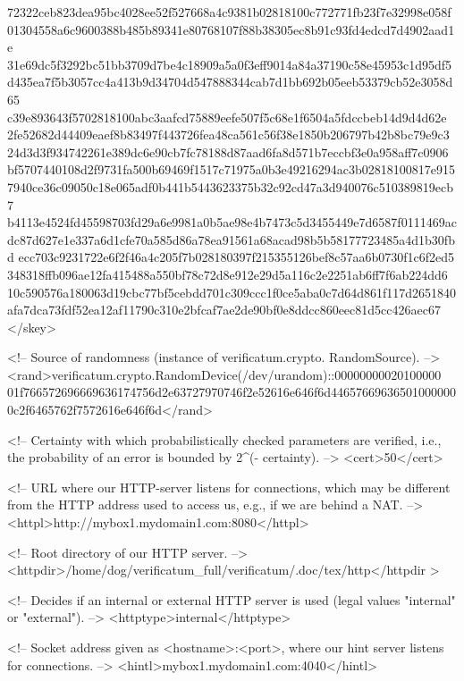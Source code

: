 72322ceb823dea95bc4028ee52f527668a4c9381b02818100c772771fb23f7e32998e058f
01304558a6c9600388b485b89341e80768107f88b38305ec8b91c93fd4edcd7d4902aad1e
31e69dc5f3292bc51bb3709d7be4c18909a5a0f3eff9014a84a37190c58e45953c1d95df5
d435ea7f5b3057cc4a413b9d34704d547888344cab7d1bb692b05eeb53379cb52e3058d65
c39e893643f5702818100abc3aafcd75889eefe507f5c68e1f6504a5fdccbeb14d9d4d62e
2fe52682d44409eaef8b83497f443726fea48ca561c56f38e1850b206797b42b8bc79e9c3
24d3d3f934742261e389dc6e90cb7fc78188d87aad6fa8d571b7eccbf3e0a958aff7c0906
bf5707440108d2f9731fa500b69469f1517c71975a0b3e49216294ac3b02818100817e915
7940ce36c09050c18e065adf0b441b5443623375b32c92cd47a3d940076c510389819ecb7
b4113e4524fd45598703fd29a6e9981a0b5ae98e4b7473c5d3455449e7d6587f0111469ac
dc87d627e1e337a6d1cfe70a585d86a78ea91561a68acad98b5b58177723485a4d1b30fbd
ecc703c9231722e6f2f46a4c205f7b028180397f215355126bef8c57aa6b0730f1c6f2ed5
348318ffb096ae12fa415488a550bf78c72d8e912e29d5a116c2e2251ab6ff7f6ab224dd6
10c590576a180063d19cbc77bf5cebdd701c309ccc1f0ce5aba0c7d64d861f117d2651840
afa7dca73fdf52ea12af11790c310e2bfcaf7ae2de90bf0e8ddcc860eec81d5cc426aec67
</skey>

   <!-- Source of randomness (instance of verificatum.crypto.
        RandomSource). -->
   <rand>verificatum.crypto.RandomDevice(/dev/urandom)::00000000020100000
01f766572696669636174756d2e63727970746f2e52616e646f6d44657669636501000000
0c2f6465762f7572616e646f6d</rand>

   <!-- Certainty with which probabilistically checked parameters are 
        verified, i.e., the probability of an error is bounded by 2^(-
        certainty). -->
   <cert>50</cert>

   <!-- URL where our HTTP-server listens for connections, which may 
        be different from the HTTP address used to access us, e.g., if 
        we are behind a NAT. -->
   <httpl>http://mybox1.mydomain1.com:8080</httpl>

   <!-- Root directory of our HTTP server. -->
   <httpdir>/home/dog/verificatum_full/verificatum/.doc/tex/http</httpdir
>

   <!-- Decides if an internal or external HTTP server is used (legal 
        values "internal" or "external"). -->
   <httptype>internal</httptype>

   <!-- Socket address given as <hostname>:<port>, where our hint 
        server listens for connections. -->
   <hintl>mybox1.mydomain1.com:4040</hintl>

